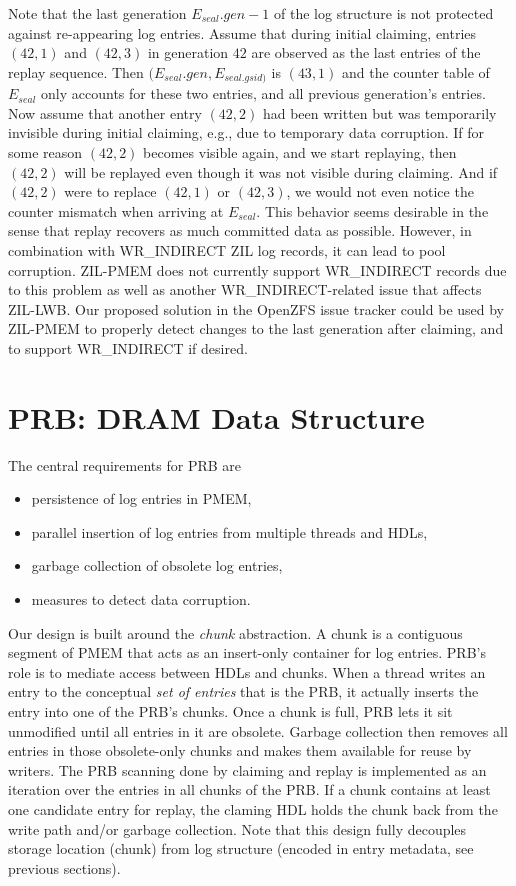 \documentclass[12pt,a4paper,twoside]{book}
\begin{document}
Note that the last generation $E_{seal}.gen - 1$ of the log structure is not protected against re-appearing log entries.
Assume that during initial claiming, entries $(42,1)$ and $(42,3)$ in generation $42$ are observed as the last entries of the replay sequence.
Then $(E_{seal}.gen, E_{seal.gsid)}$ is $(43,1)$ and the counter table of $E_{seal}$ only accounts for these two entries, and all previous generation's entries.
Now assume that another entry $(42,2)$ had been written but was temporarily invisible during initial claiming, e.g., due to temporary data corruption.
If for some reason $(42,2)$ becomes visible again, and we start replaying, then $(42,2)$ will be replayed even though it was not visible during claiming.
And if $(42,2)$ were to replace $(42,1)$ or $(42,3)$, we would not even notice the counter mismatch when arriving at $E_{seal}$.
This behavior seems desirable in the sense that replay recovers as much committed data as possible.
However, in combination with WR\_INDIRECT ZIL log records, it can lead to pool corruption.
ZIL-PMEM does not currently support WR\_INDIRECT records due to this problem as well as another WR\_INDIRECT-related issue that affects ZIL-LWB.
Our proposed solution in the OpenZFS issue tracker could be used by ZIL-PMEM to properly detect changes to the last generation after claiming, and to support WR\_INDIRECT if desired.

\section{PRB: DRAM Data Structure}\label{di:prb:dramdatastructure}
The central requirements for PRB are
\begin{itemize}[noitemsep]
    \item persistence of log entries in PMEM,
    \item parallel insertion of log entries from multiple threads and HDLs,
    \item garbage collection of obsolete log entries,
    \item measures to detect data corruption.
\end{itemize}

Our design is built around the \textit{chunk} abstraction.
A chunk is a contiguous segment of PMEM that acts as an insert-only container for log entries.
PRB's role is to mediate access between HDLs and chunks.
When a thread writes an entry to the conceptual \textit{set of entries} that is the PRB, it actually inserts the entry into one of the PRB's chunks.
Once a chunk is full, PRB lets it sit unmodified until all entries in it are obsolete.
Garbage collection then removes all entries in those obsolete-only chunks and makes them available for reuse by writers.
The PRB scanning done by claiming and replay is implemented as an iteration over the entries in all chunks of the PRB.
If a chunk contains at least one candidate entry for replay, the claming HDL holds the chunk back from the write path and/or garbage collection.
Note that this design fully decouples storage location (chunk) from log structure (encoded in entry metadata, see previous sections).
\end{document}
